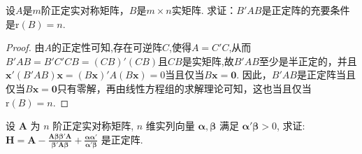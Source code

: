 \documentclass[../../main.tex]{subfiles}
\begin{document}
\begin{proposition}\label{proposition:第8章解答题6}
设\(A\)是\(m\)阶正定实对称矩阵，\(B\)是\(m\times n\)实矩阵. 求证：\(B'AB\)是正定阵的充要条件是\(\mathrm{r}(B)=n\).
\end{proposition}
\begin{proof}
由\(A\)的正定性可知,存在可逆阵$C$,使得$A=C'C$,从而\(B'AB=B'C'CB=(CB)'(CB)\)且$CB$是实矩阵,故$B'AB$至少是半正定的，并且\(\boldsymbol{x}'(B'AB)\boldsymbol{x}=(B\boldsymbol{x})'A(B\boldsymbol{x}) = 0\)当且仅当\(B\boldsymbol{x}=\boldsymbol{0}\). 因此，\(B'AB\)是正定阵当且仅当\(B\boldsymbol{x}=\boldsymbol{0}\)只有零解，再由线性方程组的求解理论可知，这也当且仅当\(\mathrm{r}(B)=n\). 

\end{proof}

\begin{proposition}\label{proposition:A正定则H正定}
设 \(\boldsymbol{A}\) 为 \(n\) 阶正定实对称矩阵, \(n\) 维实列向量 \(\boldsymbol{\alpha},\boldsymbol{\beta}\) 满足 \(\boldsymbol{\alpha}'\boldsymbol{\beta}>0\), 求证: \(\boldsymbol{H}=\boldsymbol{A}-\frac{\boldsymbol{A}\boldsymbol{\beta}\boldsymbol{\beta}'\boldsymbol{A}}{\boldsymbol{\beta}'\boldsymbol{A}\boldsymbol{\beta}}+\frac{\boldsymbol{\alpha}\boldsymbol{\alpha}'}{\boldsymbol{\alpha}'\boldsymbol{\beta}}\) 是正定阵.
\end{proposition}
\end{document}
